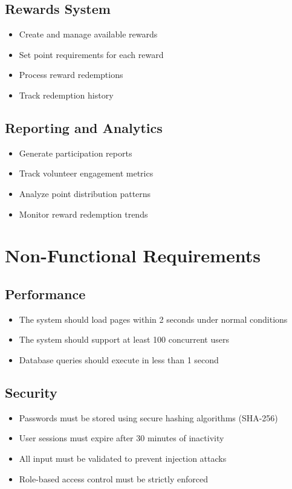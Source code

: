 \documentclass[12pt,a4paper]{report}
\begin{document}
\subsection{Rewards System}
\begin{itemize}
    \item Create and manage available rewards
    \item Set point requirements for each reward
    \item Process reward redemptions
    \item Track redemption history
\end{itemize}

\subsection{Reporting and Analytics}
\begin{itemize}
    \item Generate participation reports
    \item Track volunteer engagement metrics
    \item Analyze point distribution patterns
    \item Monitor reward redemption trends
\end{itemize}

\section{Non-Functional Requirements}

\subsection{Performance}
\begin{itemize}
    \item The system should load pages within 2 seconds under normal conditions
    \item The system should support at least 100 concurrent users
    \item Database queries should execute in less than 1 second
\end{itemize}

\subsection{Security}
\begin{itemize}
    \item Passwords must be stored using secure hashing algorithms (SHA-256)
    \item User sessions must expire after 30 minutes of inactivity
    \item All input must be validated to prevent injection attacks
    \item Role-based access control must be strictly enforced
\end{itemize}
\end{document}
